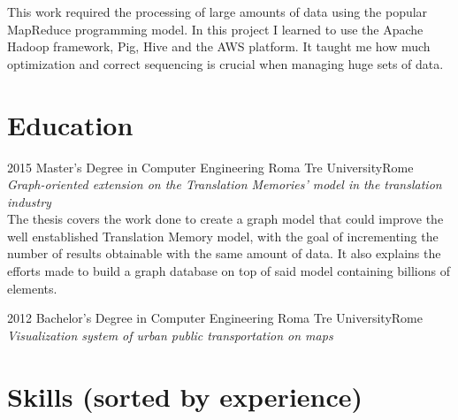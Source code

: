\documentclass[11pt,a4paper,sans]{moderncv} %
\begin{document}

{This work required the processing of large amounts of data using the popular MapReduce programming model. In this project I learned to use the Apache Hadoop framework, Pig, Hive and the AWS platform. It taught me how much optimization and correct sequencing is crucial when managing huge sets of data.}


\section{Education}

\cventry
{2015}
{Master's Degree in Computer Engineering}
{Roma Tre University}{Rome}
{}
{\emph{\normalsize {Graph-oriented extension on the Translation Memories' model in the translation industry}}\\
The thesis covers the work done to create a graph model that could improve the well enstablished Translation Memory model, with the goal of incrementing the number of results obtainable with the same amount of data. It also explains the efforts made to build a graph database on top of said model containing billions of elements.}

\cventry
{2012}
{Bachelor's Degree in Computer Engineering}
{Roma Tre University}{Rome}
{}
{\emph{\normalsize {Visualization system of urban public transportation on maps}}}


\section{Skills (sorted by experience)}


\end{document}
